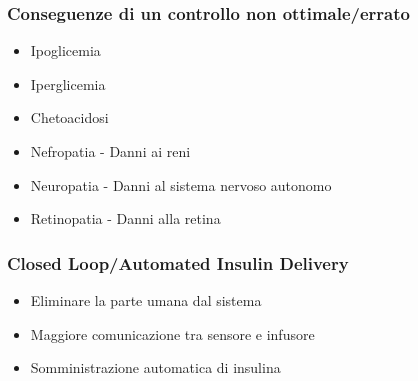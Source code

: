 \documentclass{beamer}
\begin{document}
\begin{frame}
\frametitle{Conseguenze di un controllo non ottimale/errato}
	\begin{itemize}
		\item Ipoglicemia
		\item Iperglicemia
		\item Chetoacidosi
		\item Nefropatia - Danni ai reni
		\item Neuropatia - Danni al sistema nervoso autonomo
		\item Retinopatia - Danni alla retina
	\end{itemize}
\end{frame}

\begin{frame}
\frametitle{Closed Loop/Automated Insulin Delivery}
	\begin{itemize}
		\item Eliminare la parte umana dal sistema
		\item Maggiore comunicazione tra sensore e infusore
		\item Somministrazione automatica di insulina
	\end{itemize}
\end{frame}
\end{document}
